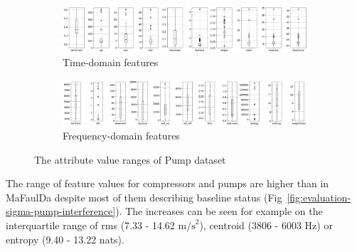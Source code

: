 \begin{figure}[h]
    \centering
    \begin{subfigure}[b]{\textwidth}
        \includegraphics[width=\textwidth]{assets/results/feature-values/pumps-TD-dim-3.png}
        \caption{Time-domain features}
    \end{subfigure}
    \hfill
    \begin{subfigure}[b]{\textwidth}
        \includegraphics[width=\textwidth]{assets/results/feature-values/pumps-FD-dim-3.png}
        \caption{Frequency-domain features}
    \end{subfigure}
    \caption{The attribute value ranges of Pump dataset}
\end{figure}

The range of feature values for compressors and pumps are higher than in MaFaulDa despite most of them describing baseline status (Fig~\ref{fig:evaluation-sigma-pump-interference}). The increases can be seen for example on the interquartile range of rms (7.33 - 14.62 $\mathrm{m/s}^2$), centroid (3806 - 6003 Hz) or entropy (9.40 - 13.22 nats).